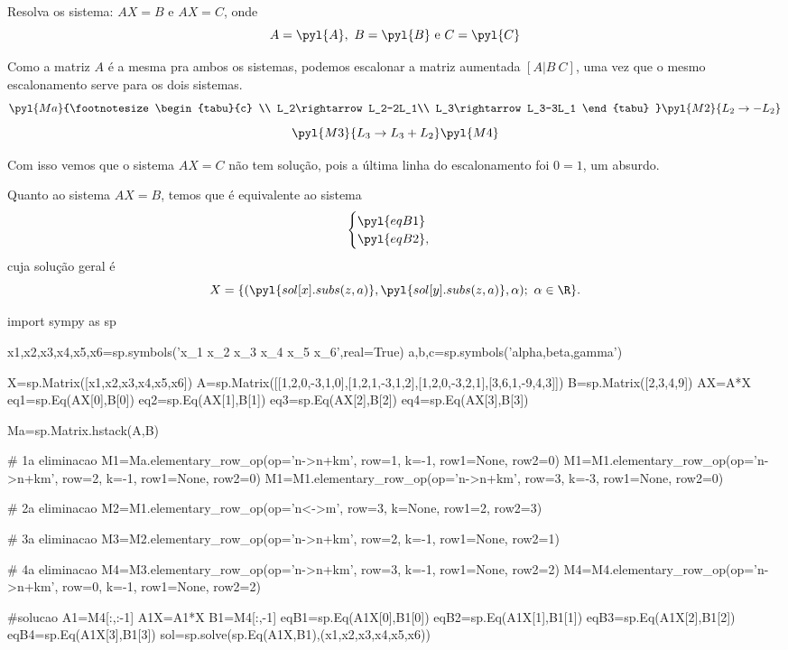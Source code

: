 \question
Resolva os sistema: $AX=B$ e $AX=C$, onde 
\[A=\pyl{A},\ B=\pyl{B} \text{ e } C=\pyl{C}\]

\begin{solution}
Como a matriz $A$ é a mesma pra ambos os sistemas, podemos escalonar a matriz aumentada $[A\vert B\ C]$, uma vez que o mesmo escalonamento serve para os dois sistemas.
\[\pyl{Ma} 
{\footnotesize \begin{tabu}{c}
\\
L_2\rightarrow L_2-2L_1\\
L_3\rightarrow L_3-3L_1
\end{tabu} }
 \pyl{M2}
{\footnotesize L_2\rightarrow -L_2}
\]
\[
\pyl{M3}
{\footnotesize L_3\rightarrow L_3+L_2}
\pyl{M4}
\]

Com isso vemos que o sistema $AX=C$ não tem solução, pois a última linha do escalonamento foi $0=1$, um absurdo. 

Quanto ao sistema $AX=B$, temos que é equivalente ao sistema
\[\begin{cases}
\pyl{eqB1}\\
\pyl{eqB2}, 
\end{cases}\]
cuja solução geral é 
\[X=\{(\pyl{sol[x].subs(z,a)},\pyl{sol[y].subs(z,a)},\alpha);\ \alpha\in \R \}.\]
\end{solution}



\begin{pycode}
import sympy as sp

x1,x2,x3,x4,x5,x6=sp.symbols('x_1 x_2 x_3 x_4 x_5 x_6',real=True)
a,b,c=sp.symbols('alpha,beta,gamma')

X=sp.Matrix([x1,x2,x3,x4,x5,x6])
A=sp.Matrix([[1,2,0,-3,1,0],[1,2,1,-3,1,2],[1,2,0,-3,2,1],[3,6,1,-9,4,3]])
B=sp.Matrix([2,3,4,9])
AX=A*X
eq1=sp.Eq(AX[0],B[0])
eq2=sp.Eq(AX[1],B[1])
eq3=sp.Eq(AX[2],B[2])
eq4=sp.Eq(AX[3],B[3])


Ma=sp.Matrix.hstack(A,B)

# 1a eliminacao
M1=Ma.elementary_row_op(op='n->n+km', row=1, k=-1, row1=None, row2=0)
M1=M1.elementary_row_op(op='n->n+km', row=2, k=-1, row1=None, row2=0)
M1=M1.elementary_row_op(op='n->n+km', row=3, k=-3, row1=None, row2=0)

# 2a eliminacao
M2=M1.elementary_row_op(op='n<->m', row=3, k=None, row1=2, row2=3)

# 3a eliminacao
M3=M2.elementary_row_op(op='n->n+km', row=2, k=-1, row1=None, row2=1)

# 4a eliminacao
M4=M3.elementary_row_op(op='n->n+km', row=3, k=-1, row1=None, row2=2)
M4=M4.elementary_row_op(op='n->n+km', row=0, k=-1, row1=None, row2=2)

#solucao
A1=M4[:,:-1]
A1X=A1*X
B1=M4[:,-1]
eqB1=sp.Eq(A1X[0],B1[0])
eqB2=sp.Eq(A1X[1],B1[1])
eqB3=sp.Eq(A1X[2],B1[2])
eqB4=sp.Eq(A1X[3],B1[3])
sol=sp.solve(sp.Eq(A1X,B1),(x1,x2,x3,x4,x5,x6))
\end{pycode}

